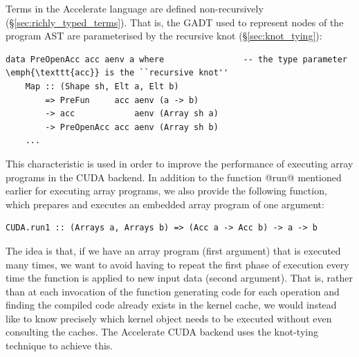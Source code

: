 Terms in the Accelerate language are defined non-recursively
(\S\ref{sec:richly_typed_terms}). That is, the GADT used to represent nodes
of the program AST are parameterised by the recursive knot
(\S\ref{sec:knot_tying}):
%
\begin{lstlisting}[style=haskell]
data PreOpenAcc acc aenv a where                -- the type parameter \emph{\texttt{acc}} is the ``recursive knot''
    Map :: (Shape sh, Elt a, Elt b)
        => PreFun     acc aenv (a -> b)
        -> acc            aenv (Array sh a)
        -> PreOpenAcc acc aenv (Array sh b)
    ...
\end{lstlisting}

This characteristic is used in order to improve the performance of executing
array programs in the CUDA backend. In addition to the function @run@
mentioned earlier for executing array programs, we also provide the following
function, which prepares and executes an embedded array program of one argument:
%
\begin{lstlisting}[style=haskell]
CUDA.run1 :: (Arrays a, Arrays b) => (Acc a -> Acc b) -> a -> b
\end{lstlisting}
%
The idea is that, if we have an array program (first argument) that is executed
many times, we want to avoid having to repeat the first phase of execution every
time the function is applied to new input data (second argument). That is,
rather than at each invocation of the function generating code for each
operation and finding the compiled code already exists in the kernel cache, we
would instead like to know precisely which kernel object needs to be executed
without even consulting the caches. The Accelerate CUDA backend uses the
knot-tying technique %
to achieve this.

